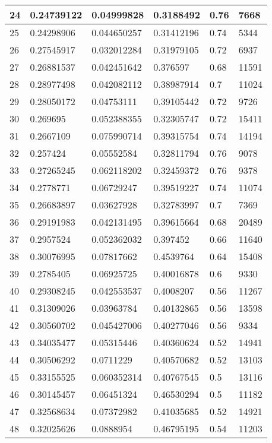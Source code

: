 \begin{longtable}{|l|l|l|l|l|l|}
24 & 0.24739122 & 0.04999828 & 0.3188492 & 0.76 & 7668 \\ \hline 
25 & 0.24298906 & 0.044650257 & 0.31412196 & 0.74 & 5344 \\ \hline 
26 & 0.27545917 & 0.032012284 & 0.31979105 & 0.72 & 6937 \\ \hline 
27 & 0.26881537 & 0.042451642 & 0.376597 & 0.68 & 11591 \\ \hline 
28 & 0.28977498 & 0.042082112 & 0.38987914 & 0.7 & 11024 \\ \hline 
29 & 0.28050172 & 0.04753111 & 0.39105442 & 0.72 & 9726 \\ \hline 
30 & 0.269695 & 0.052388355 & 0.32305747 & 0.72 & 15411 \\ \hline 
31 & 0.2667109 & 0.075990714 & 0.39315754 & 0.74 & 14194 \\ \hline 
32 & 0.257424 & 0.05552584 & 0.32811794 & 0.76 & 9078 \\ \hline 
33 & 0.27265245 & 0.062118202 & 0.32459372 & 0.76 & 9378 \\ \hline 
34 & 0.2778771 & 0.06729247 & 0.39519227 & 0.74 & 11074 \\ \hline 
35 & 0.26683897 & 0.03627928 & 0.32783997 & 0.7 & 7369 \\ \hline 
36 & 0.29191983 & 0.042131495 & 0.39615664 & 0.68 & 20489 \\ \hline 
37 & 0.2957524 & 0.052362032 & 0.397452 & 0.66 & 11640 \\ \hline 
38 & 0.30076995 & 0.07817662 & 0.4539764 & 0.64 & 15408 \\ \hline 
39 & 0.2785405 & 0.06925725 & 0.40016878 & 0.6 & 9330 \\ \hline 
40 & 0.29308245 & 0.042553537 & 0.4008207 & 0.56 & 11267 \\ \hline 
41 & 0.31309026 & 0.03963784 & 0.40132865 & 0.56 & 13598 \\ \hline 
42 & 0.30560702 & 0.045427006 & 0.40277046 & 0.56 & 9334 \\ \hline 
43 & 0.34035477 & 0.05315446 & 0.40360624 & 0.52 & 14941 \\ \hline 
44 & 0.30506292 & 0.0711229 & 0.40570682 & 0.52 & 13103 \\ \hline 
45 & 0.33155525 & 0.060352314 & 0.40767545 & 0.5 & 13116 \\ \hline 
46 & 0.30145457 & 0.06451324 & 0.46530294 & 0.5 & 11182 \\ \hline 
47 & 0.32568634 & 0.07372982 & 0.41035685 & 0.52 & 14921 \\ \hline 
48 & 0.32025626 & 0.0888954 & 0.46795195 & 0.54 & 11203 \\ \hline 

\end{longtable}
